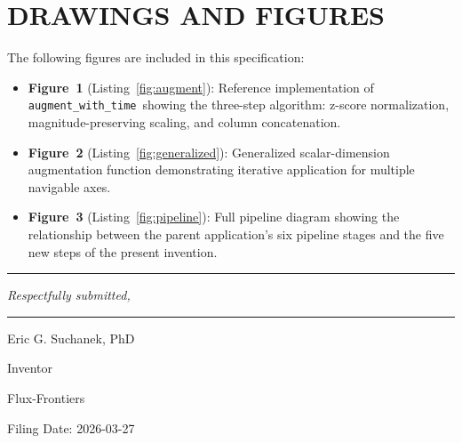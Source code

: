 \documentclass[12pt,letterpaper]{article}
\newcommand{\augtime}{\texttt{augment\_with\_time}}
\begin{document}
\newpage
\section*{DRAWINGS AND FIGURES}

The following figures are included in this specification:

\begin{itemize}
  \item \textbf{Figure~1} (Listing~\ref{fig:augment}): Reference implementation
    of \augtime\ showing the three-step algorithm: z-score normalization,
    magnitude-preserving scaling, and column concatenation.

  \item \textbf{Figure~2} (Listing~\ref{fig:generalized}): Generalized
    scalar-dimension augmentation function demonstrating iterative application
    for multiple navigable axes.

  \item \textbf{Figure~3} (Listing~\ref{fig:pipeline}): Full pipeline diagram
    showing the relationship between the parent application's six pipeline
    stages and the five new steps of the present invention.
\end{itemize}

\bigskip
\noindent\rule{\textwidth}{0.4pt}

\bigskip

\noindent\textit{Respectfully submitted,}

\vspace{2em}

\noindent\rule{3in}{0.4pt}

\noindent Eric G. Suchanek, PhD

\noindent Inventor

\noindent Flux-Frontiers

\vspace{1em}

\noindent Filing Date: 2026-03-27
\end{document}
